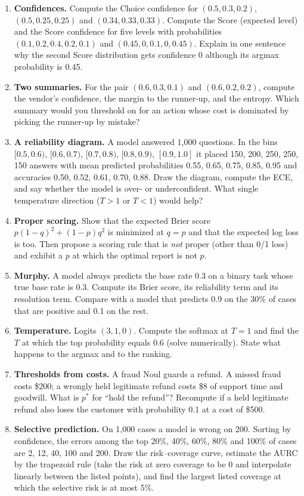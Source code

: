 \documentclass[11pt,letterpaper]{article}
\begin{document}
\begin{enumerate}[leftmargin=1.6em,itemsep=6pt]
\item \textbf{Confidences.} Compute the Choice confidence for $(0.5,0.3,0.2)$, $(0.5,0.25,0.25)$ and $(0.34,0.33,0.33)$. Compute the Score (expected level) and the Score confidence for five levels with probabilities $(0.1,0.2,0.4,0.2,0.1)$ and $(0.45,0,0.1,0,0.45)$. Explain in one sentence why the second Score distribution gets confidence 0 although its argmax probability is 0.45.
\item \textbf{Two summaries.} For the pair $(0.6,0.3,0.1)$ and $(0.6,0.2,0.2)$, compute the vendor's confidence, the margin to the runner-up, and the entropy. Which summary would you threshold on for an action whose cost is dominated by picking the runner-up by mistake?
\item \textbf{A reliability diagram.} A model answered 1,000 questions. In the bins $[0.5,0.6)$, $[0.6,0.7)$, $[0.7,0.8)$, $[0.8,0.9)$, $[0.9,1.0]$ it placed 150, 200, 250, 250, 150 answers with mean predicted probabilities 0.55, 0.65, 0.75, 0.85, 0.95 and accuracies 0.50, 0.52, 0.61, 0.70, 0.88. Draw the diagram, compute the ECE, and say whether the model is over- or underconfident. What single temperature direction ($T>1$ or $T<1$) would help?
\item \textbf{Proper scoring.} Show that the expected Brier score $p(1-q)^2+(1-p)q^2$ is minimized at $q=p$ and that the expected log loss is too. Then propose a scoring rule that is \emph{not} proper (other than 0/1 loss) and exhibit a $p$ at which the optimal report is not $p$.
\item \textbf{Murphy.} A model always predicts the base rate 0.3 on a binary task whose true base rate is 0.3. Compute its Brier score, its reliability term and its resolution term. Compare with a model that predicts 0.9 on the 30\% of cases that are positive and 0.1 on the rest.
\item \textbf{Temperature.} Logits $(3,1,0)$. Compute the softmax at $T=1$ and find the $T$ at which the top probability equals 0.6 (solve numerically). State what happens to the argmax and to the ranking.
\item \textbf{Thresholds from costs.} A fraud Noul guards a refund. A missed fraud costs \$200; a wrongly held legitimate refund costs \$8 of support time and goodwill. What is $p^{*}$ for ``hold the refund''? Recompute if a held legitimate refund also loses the customer with probability 0.1 at a cost of \$500.
\item \textbf{Selective prediction.} On 1,000 cases a model is wrong on 200. Sorting by confidence, the errors among the top 20\%, 40\%, 60\%, 80\% and 100\% of cases are 2, 12, 40, 100 and 200. Draw the risk--coverage curve, estimate the AURC by the trapezoid rule (take the risk at zero coverage to be 0 and interpolate linearly between the listed points), and find the largest listed coverage at which the selective risk is at most 5\%.

\end{enumerate}
\end{document}
